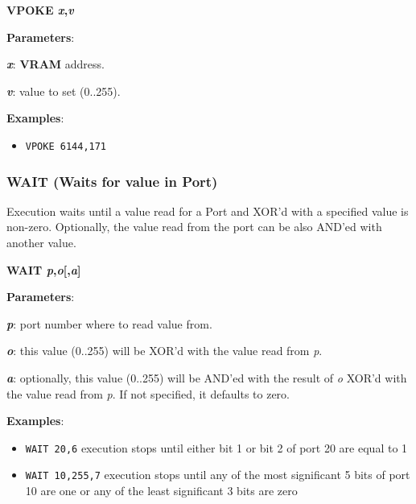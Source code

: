    \hspace{1.9cm}\textbf{VPOKE \textit{x},\textit{v}}

    \textbf{Parameters}:

    \hspace{1cm}\textbf{\textit{x}}: \textbf{VRAM} address.

    \hspace{1cm}\textbf{\textit{v}}: value to set (0..255).

    \textbf{Examples}:
    \begin{itemize}
        \item \texttt{VPOKE 6144,171}
    \end{itemize}

    \subsubsection{{WAIT (Waits for value in Port)}}
    \label{msbasic:lang:wait}
    Execution waits until a value read for a Port and XOR'd with a specified
    value is non-zero. Optionally, the value read from the port can be also
    AND'ed with another value.

    \hspace{1.9cm}\textbf{WAIT \textit{p},\textit{o}[,\textit{a}]}

    \textbf{Parameters}:

    \hspace{1cm}\textbf{\textit{p}}: port number where to read value from.

    \hspace{1cm}\textbf{\textit{o}}: this value (0..255) will be XOR'd with the
    value read from \textit{p}.

    \hspace{1cm}\textbf{\textit{a}}: optionally, this value (0..255) will be
    AND'ed with the result of \textit{o} XOR'd with the value read from
    \textit{p}. If not specified, it defaults to zero.

    \textbf{Examples}:
    \begin{itemize}
        \item \texttt{WAIT 20,6} execution stops until either bit 1 or bit 2 of
        port 20 are equal to 1
        \item \texttt{WAIT 10,255,7} execution stops until any of the most
        significant 5 bits of port 10 are one or any of the least significant 3
        bits are zero
    \end{itemize}
